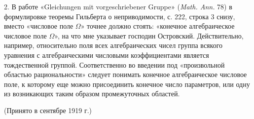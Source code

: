 \documentclass[11pt]{article}
\begin{document}
2. В работе «Gleichungen mit vorgeschriebener Gruppe» (\emph{Math. Ann.} 78) в формулировке теоремы Гильберта о неприводимости, с. 222, строка 3 снизу, вместо «числовое поле \(\Omega\)» точнее должно стоять: «конечное алгебраическое числовое поле \(\Omega\)», на что мне указывает господин Островский. Действительно, например, относительно поля всех алгебраических чисел группа всякого уравнения с алгебраическими числовыми коэффициентами является тождественной группой. Соответственно во введении под «произвольной областью рациональности» следует понимать конечное алгебраическое числовое поле, к которому еще можно присоединить конечное число параметров, или одну из возникающих таким образом промежуточных областей.

\begin{center}
(Принято в сентябре 1919 г.)
\end{center}
\end{document}
